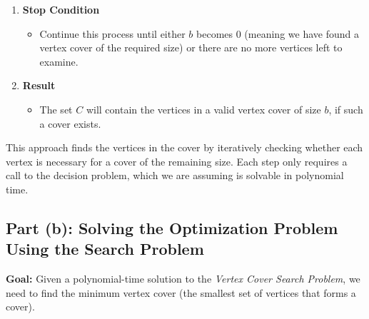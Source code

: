 \documentclass[11pt]{article}
\begin{document}
\begin{enumerate}
    \item \textbf{Stop Condition}
    \begin{itemize}
        \item Continue this process until either \( b \) becomes 0 (meaning we have found a vertex cover of the required size) or there are no more vertices left to examine.
    \end{itemize}

    \item \textbf{Result}
    \begin{itemize}
        \item The set \( C \) will contain the vertices in a valid vertex cover of size \( b \), if such a cover exists.
    \end{itemize}
\end{enumerate}

This approach finds the vertices in the cover by iteratively checking whether each vertex is necessary for a cover of the remaining size. Each step only requires a call to the decision problem, which we are assuming is solvable in polynomial time.


\newpage


\subsection*{Part (b): Solving the Optimization Problem Using the Search Problem}
\textbf{Goal:} Given a polynomial-time solution to the \textit{Vertex Cover Search Problem}, we need to find the minimum vertex cover (the smallest set of vertices that forms a cover).
\end{document}
